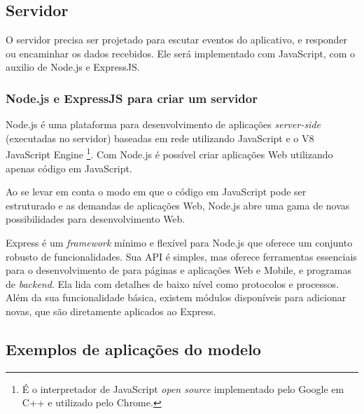 \documentclass[a4paper,12pt]{article}
\begin{document}
\newpage
\subsection{Servidor}

O servidor precisa ser projetado para escutar eventos do aplicativo, e responder ou encaminhar os dados recebidos. Ele será implementado com JavaScript, com o auxilio de Node.js e ExpressJS.

\subsubsection{Node.js e ExpressJS para criar um servidor}

Node.js é uma plataforma para desenvolvimento de aplicações \emph{server-side} (executadas no servidor) baseadas em rede utilizando JavaScript e o V8 JavaScript Engine \footnote{É o interpretador de JavaScript \emph{open source} implementado pelo Google em C++ e utilizado pelo Chrome.}. Com Node.js é possível criar aplicações Web utilizando apenas código em JavaScript.

Ao se levar em conta o modo em que o código em JavaScript pode ser estruturado e as demandas de aplicações Web, Node.js abre uma gama de novas possibilidades para desenvolvimento Web.

Express é um \emph{framework} mínimo e flexível para Node.js que oferece um conjunto robusto de funcionalidades. Sua API é simples, mas oferece ferramentas essenciais para o desenvolvimento de para páginas e aplicações Web e Mobile, e programas de \emph{backend}. Ela lida com detalhes de baixo nível como protocolos e processos. Além da sua funcionalidade básica, existem módulos disponíveis para adicionar novas, que são diretamente aplicados ao Express.


\newpage
\subsection{Exemplos de aplicações do modelo}
\end{document}
